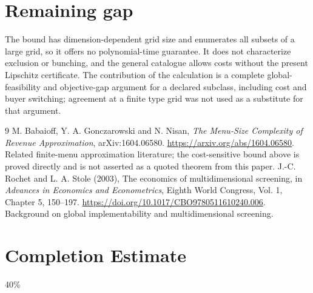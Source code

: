 \documentclass[11pt]{article}
\theoremstyle{definition}
\theoremstyle{remark}
\begin{document}
\section{Remaining gap}
The bound has dimension-dependent grid size and enumerates all subsets of a large grid, so it offers no polynomial-time guarantee. It does not characterize exclusion or bunching, and the general catalogue allows costs without the present Lipschitz certificate. The contribution of the calculation is a complete global-feasibility and objective-gap argument for a declared subclass, including cost and buyer switching; agreement at a finite type grid was not used as a substitute for that argument.

\begin{thebibliography}{9}
 M. Babaioff, Y. A. Gonczarowski and N. Nisan, \emph{The Menu-Size Complexity of Revenue Approximation}, arXiv:1604.06580. \url{https://arxiv.org/abs/1604.06580}. Related finite-menu approximation literature; the cost-sensitive bound above is proved directly and is not asserted as a quoted theorem from this paper.
 J.-C. Rochet and L. A. Stole (2003), The economics of multidimensional screening, in \emph{Advances in Economics and Econometrics}, Eighth World Congress, Vol. 1, Chapter 5, 150--197. \url{https://doi.org/10.1017/CBO9780511610240.006}. Background on global implementability and multidimensional screening.
\end{thebibliography}
\section{Completion Estimate}
40\%
\end{document}
